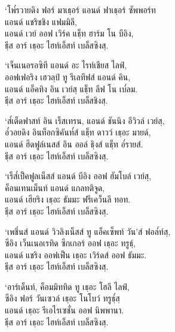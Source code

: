 \begin{english}
\begin{english}
‘โพ๎รวายดิง ฟอร์ มาเธฺอร์ แอนด์ ฟาเธฺอร์ ซัพพอร์ท\\
แอนด์ แชริชชิง แฟมมิลี,\\
แอนด์ เวย์ ออฟ เวิร์ค แธฺ็ท ฮาร์ม โน บีอิง,\\
ธฺีส อาร์ เธฺอะ ไฮท์เอ็สท์ เบล็สซิงสฺ.
\end{english}

\begin{english}
‘เจ็นเนอรอซิที แอนด์ อะ ไรท์เชียส ไลฟ์,\\
ออฟเฟอริง เฮวลฺป์ ทู รีเลทีฟส์ แอนด์ คิน,\\
แอนด์ แอ็คทิง อิน เวย์สฺ แธฺ็ท ลีฟ โน เบ๎ลม.\\
ธฺีส อาร์ เธฺอะ ไฮท์เอ็สท์ เบล็สชิงสฺ.
\end{english}

\begin{english}
‘ส๎เต็ดฟาสท์ อิน เร็สเทรน, แอนด์ ชันนิง อีวิวล์ เวย์สฺ,\\
อ๎วอยดิง อินท็อกซิคันท๎ส์ แธฺ็ท ดาวว์ เธฺอะ มายด์,\\
แอนด์ ฮีดฟูล์เนสส์ อิน ออล์ ธฺิงส์ แธฺ็ท อ๎รายส์.\\
ธฺีส อาร์ เธฺอะ ไฮท์เอ็สท์ เบล็สซิงสฺ.
\end{english}

\begin{english}
‘เร็ส๎เป็คฟูลเน็สส์ แอนด์ บีอิง ออฟ ฮัมโบล์ เวย์สฺ,\\
ค็อนเทนเม็นท์ แอนด์ แกลทติจูด,\\
แอนด์ เฮียริง เธฺอะ ธัมมะ ฟรีเคว็นลี ทอท.\\
ธฺีส อาร์ เธฺอะ ไฮท์เอ็สท์ เบล็สซิงสฺ.
\end{english}

\begin{english}
‘เพชึ่นส์ แอนด์ วิวลิงเน็สส์ ทู แอ็คเซ็พท์ วัน’ส์ ฟอล๎ท์สฺ,\\
ซีอิง เว็นเนอเรทิด ซีกเกอร์ ออฟ เธฺอะ ทรูธฺ์,\\
แอนด์ แชริง ออฟเฟ็น เธฺอะ เวิร์ดส์ ออฟ ธัมมะ.\\
ธฺีส อาร์ เธฺอะ ไฮท์เอ็สท์ เบล็สซิงสฺ.
\end{english}

\begin{english}
‘อาร์เด็นท์, ค็อมมิททิด ทู เธฺอะ โฮลี ไลฟ์,\\
ซีอิง ฟอร์ วันเซวล์ เธฺอะ โนโบว์ ทรูธฺ๎สฺ\\
แอนด์ เธฺอะ รีเอไรเซชั่น ออฟ นิพพานา.\\
ธฺีส อาร์ เธฺอะ ไฮท์เอ็สท์ เบล็สซิงสฺ.
\end{english}


\end{english}
